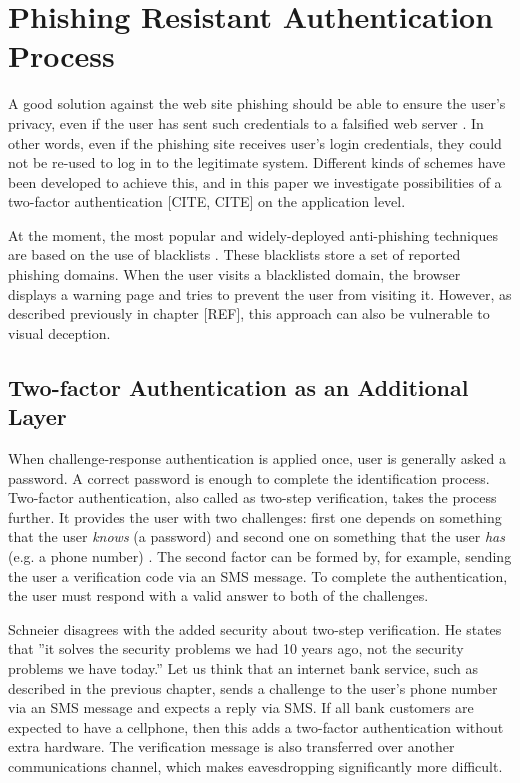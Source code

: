 \documentclass{tktltiki}
\begin{document}
      
      
      
    
\section{Phishing Resistant Authentication Process}

    A good solution against the web site phishing should be able to ensure the user's privacy, even if the user has sent such credentials to a falsified web server \cite{phishing_attacks_and_solutions_2007}. In other words, even if the phishing site receives user's login credentials, they could not be re-used to log in to the legitimate system. Different kinds of schemes have been developed to achieve this, and in this paper we investigate possibilities of a two-factor authentication \cite{NIST_SP800-63, schneier_2factor_2005, google_2step_2010}[CITE, CITE] on the application level.

    At the moment, the most popular and widely-deployed anti-phishing techniques are based on the use of blacklists \cite{visual_similarity_phishing_2008}. These blacklists store a set of reported phishing domains. When the user visits a blacklisted domain, the browser displays a warning page and tries to prevent the user from visiting it. However, as described previously in chapter [REF], this approach can also be vulnerable to visual deception.



\subsection{Two-factor Authentication as an Additional Layer}

    When challenge-response authentication is applied once, user is generally asked a password. A correct password is enough to complete the identification process. Two-factor authentication, also called as two-step verification, takes the process further. It provides the user with two challenges: first one depends on something that the user \emph{knows} (a password) and second one on something that the user \emph{has} (e.g. a phone number) \cite{NIST_SP800-63}. The second factor can be formed by, for example, sending the user a verification code via an SMS message. To complete the authentication, the user must respond with a valid answer to both of the challenges.

    Schneier \cite{schneier_2factor_2005} disagrees with the added security about two-step verification. He states that ''it solves the security problems we had 10 years ago, not the security problems we have today.'' Let us think that an internet bank service, such as described in the previous chapter, sends a challenge to the user's phone number via an SMS message and expects a reply via SMS. If all bank customers are expected to have a cellphone, then this adds a two-factor authentication without extra hardware. The verification message is also transferred over another communications channel, which makes eavesdropping significantly more difficult.
\end{document}
